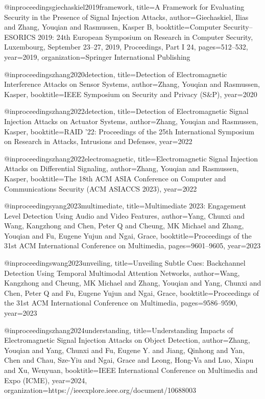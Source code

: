 @inproceedings{giechaskiel2019framework,
  title={A Framework for Evaluating Security in the Presence of Signal Injection Attacks},
  author={Giechaskiel, Ilias and Zhang, Youqian and Rasmussen, Kasper B},
  booktitle={Computer Security--ESORICS 2019: 24th European Symposium on Research in Computer Security, Luxembourg, September 23--27, 2019, Proceedings, Part I 24},
  pages={512--532},
  year={2019},
  organization={Springer International Publishing}
}

@inproceedings{zhang2020detection,
  title={Detection of Electromagnetic Interference Attacks on Sensor Systems},
  author={Zhang, Youqian and Rasmussen, Kasper},
  booktitle={IEEE Symposium on Security and Privacy (S\&P)},
  year={2020}
}

@inproceedings{zhang2022detection,
  title={Detection of Electromagnetic Signal Injection Attacks on Actuator Systems},
  author={Zhang, Youqian and Rasmussen, Kasper},
  booktitle={RAID '22: Proceedings of the 25th International Symposium on Research in Attacks, Intrusions and Defenses},
  year={2022}
}

@inproceedings{zhang2022electromagnetic,
  title={Electromagnetic Signal Injection Attacks on Differential Signaling},
  author={Zhang, Youqian and Rasmussen, Kasper},
  booktitle={The 18th ACM ASIA Conference on Computer and Communications Security (ACM ASIACCS 2023)},
  year={2022}
}

@inproceedings{yang2023multimediate,
  title={Multimediate 2023: Engagement Level Detection Using Audio and Video Features},
  author={Yang, Chunxi and Wang, Kangzhong and Chen, Peter Q and Cheung, MK Michael and Zhang, Youqian and Fu, Eugene Yujun and Ngai, Grace},
  booktitle={Proceedings of the 31st ACM International Conference on Multimedia},
  pages={9601--9605},
  year={2023}
}

@inproceedings{wang2023unveiling,
  title={Unveiling Subtle Cues: Backchannel Detection Using Temporal Multimodal Attention Networks},
  author={Wang, Kangzhong and Cheung, MK Michael and Zhang, Youqian and Yang, Chunxi and Chen, Peter Q and Fu, Eugene Yujun and Ngai, Grace},
  booktitle={Proceedings of the 31st ACM International Conference on Multimedia},
  pages={9586--9590},
  year={2023}
}

@inproceedings{zhang2024understanding,
  title={Understanding Impacts of Electromagnetic Signal Injection Attacks on Object Detection},
  author={Zhang, Youqian and Yang, Chunxi and Fu, Eugene Y. and Jiang, Qinhong and Yan, Chen and Chau, Sze-Yiu and Ngai, Grace and Leong, Hong-Va and Luo, Xiapu and Xu, Wenyuan},
  booktitle={IEEE International Conference on Multimedia and Expo (ICME)},
  year={2024},
  organization={https://ieeexplore.ieee.org/document/10688003}
}

